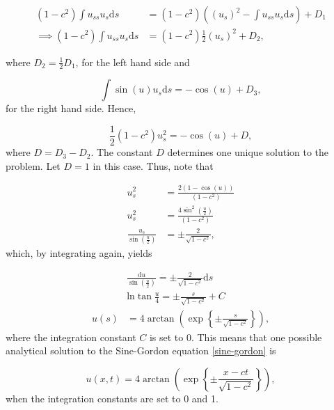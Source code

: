 \begin{align*}
    (1-c^2)\int u_{ss}u_s\mathrm{d}s &= (1-c^2)\left((u_{s})^2 - \int u_{ss}u_s\mathrm{d}s \right) + D_1\nonumber \\
    \implies (1-c^2)\int u_{ss}u_s\mathrm{d}s &= (1-c^2)\frac{1}{2}(u_{s})^2 + D_2, 
\end{align*}

where $D_2 = \frac{1}{2}D_1$, for the left hand side and 

\begin{equation*}
     \int \sin{(u)}u_s \mathrm{d}s = -\cos{(u)} + D_3,
\end{equation*}
for the right hand side. Hence, 

\begin{equation*}
    \frac{1}{2}(1-c^2)u^2_s = -\cos{(u)} + D, 
\end{equation*}
where $D = D_3 - D_2$. The constant $D$ determines one unique solution to the problem. Let $D = 1$ in this case. Thus, note that 

\begin{align*}
    u^2_s &= \frac{2(1 - \cos{(u)})}{(1-c^2)} \nonumber \\
    u^2_s &= \frac{4\sin^2{(\frac{u}{2})}}{(1-c^2)} \nonumber \\
    \frac{u_s}{\sin{(\frac{u}{2})}} &= \pm \frac{2}{\sqrt{1-c^2}}, 
\end{align*}
which, by integrating again, yields 

\begin{align*}
    &\frac{\mathrm{d}u}{\sin{(\frac{u}{2})}} = \pm \frac{2}{\sqrt{1-c^2}} \mathrm{d}s \nonumber \\
    &\mathrm{ln}\tan{\frac{u}{4}} = \pm \frac{s}{\sqrt{1-c^2}} + C \nonumber \\
    u(s) &= 4\arctan{\left(\exp{\left\{\pm \frac{s}{\sqrt{1-c^2}}\right\}}\right)},
\end{align*}
where the integration constant $C$ is set to 0. This means that one possible analytical solution to the Sine-Gordon equation \eqref{sine-gordon} is 

\begin{equation}
    u(x,t) = 4\arctan{\left(\exp{\left\{\pm \frac{x-ct}{\sqrt{1-c^2}}\right\}}\right)}, 
    \label{Part2-analytic-solution}
\end{equation}
when the integration constants are set to 0 and 1. 

